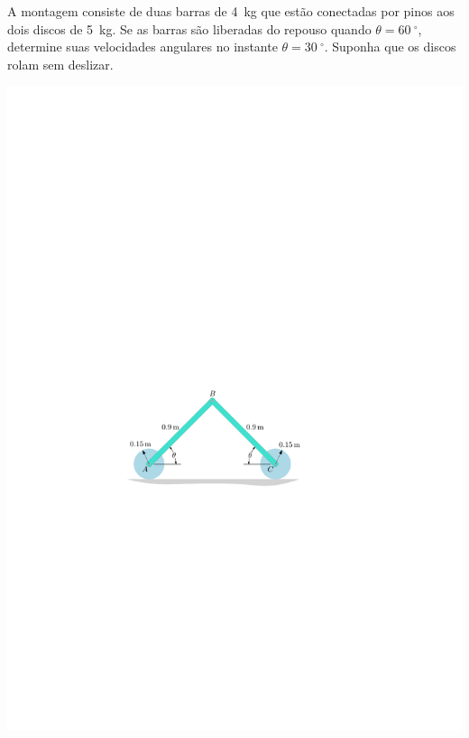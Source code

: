 \item A montagem consiste de duas barras de \SI{4}{\kilogram} que estão conectadas por pinos aos dois discos de \SI{5}{\kilogram}.
Se as barras são liberadas do repouso quando $\theta=\SI{60}{^{\circ}}$, determine suas velocidades angulares no instante $\theta=\SI{30}{^{\circ}}$. Suponha que os discos rolam sem deslizar.

\begin{flushright}
	\includegraphics[scale=1.2]{../../images/draw_7}
\end{flushright}